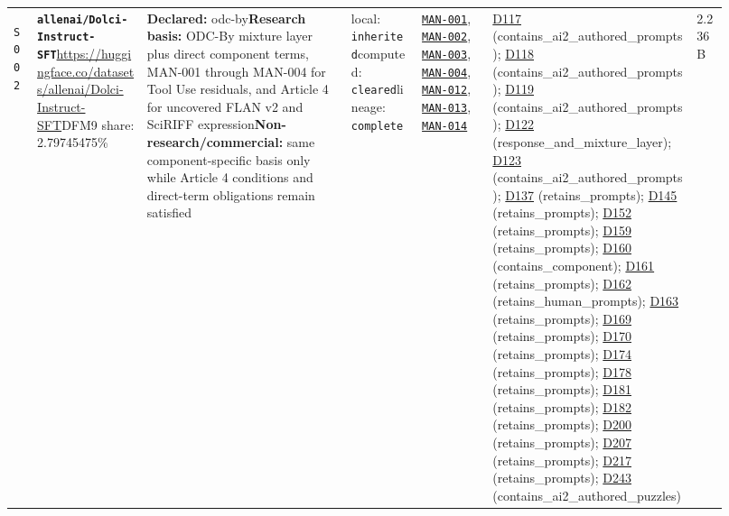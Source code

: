 \documentclass[9pt,a4paper]{article}
\newcommand{\srcid}[1]{\hypertarget{src:#1}{\texttt{#1}}}
\begin{document}
\begin{landscape}
\begin{longtable}{@{}L{0.03\linewidth}L{0.14\linewidth}L{0.26\linewidth}L{0.09\linewidth}L{0.09\linewidth}L{0.265\linewidth}L{0.045\linewidth}@{}}
\srcid{S002} & \textbf{\nolinkurl{allenai/Dolci-Instruct-SFT}}\newline \url{https://huggingface.co/datasets/allenai/Dolci-Instruct-SFT}\newline DFM9 share: 2.79745475\% & \textbf{Declared:} odc-by\newline \textbf{Research basis:} ODC-By mixture layer plus direct component terms, MAN-001 through MAN-004 for Tool Use residuals, and Article 4 for uncovered FLAN v2 and SciRIFF expression\newline \textbf{Non-research/commercial:} same component-specific basis only while Article 4 conditions and direct-term obligations remain satisfied & local: \texttt{inherited}\newline computed: \texttt{cleared}\newline lineage: \texttt{complete} & \hyperlink{manual:MAN-001}{\texttt{MAN-001}}, \hyperlink{manual:MAN-002}{\texttt{MAN-002}}, \hyperlink{manual:MAN-003}{\texttt{MAN-003}}, \hyperlink{manual:MAN-004}{\texttt{MAN-004}}, \hyperlink{manual:MAN-012}{\texttt{MAN-012}}, \hyperlink{manual:MAN-013}{\texttt{MAN-013}}, \hyperlink{manual:MAN-014}{\texttt{MAN-014}} & \hyperlink{dep:D117}{D117} (contains\_ai2\_authored\_prompts); \hyperlink{dep:D118}{D118} (contains\_ai2\_authored\_prompts); \hyperlink{dep:D119}{D119} (contains\_ai2\_authored\_prompts); \hyperlink{dep:D122}{D122} (response\_and\_mixture\_layer); \hyperlink{dep:D123}{D123} (contains\_ai2\_authored\_prompts); \hyperlink{dep:D137}{D137} (retains\_prompts); \hyperlink{dep:D145}{D145} (retains\_prompts); \hyperlink{dep:D152}{D152} (retains\_prompts); \hyperlink{dep:D159}{D159} (retains\_prompts); \hyperlink{dep:D160}{D160} (contains\_component); \hyperlink{dep:D161}{D161} (retains\_prompts); \hyperlink{dep:D162}{D162} (retains\_human\_prompts); \hyperlink{dep:D163}{D163} (retains\_prompts); \hyperlink{dep:D169}{D169} (retains\_prompts); \hyperlink{dep:D170}{D170} (retains\_prompts); \hyperlink{dep:D174}{D174} (retains\_prompts); \hyperlink{dep:D178}{D178} (retains\_prompts); \hyperlink{dep:D181}{D181} (retains\_prompts); \hyperlink{dep:D182}{D182} (retains\_prompts); \hyperlink{dep:D200}{D200} (retains\_prompts); \hyperlink{dep:D207}{D207} (retains\_prompts); \hyperlink{dep:D217}{D217} (retains\_prompts); \hyperlink{dep:D243}{D243} (contains\_ai2\_authored\_puzzles) & 2.236B \\

\end{longtable}
\end{landscape}
\end{document}
